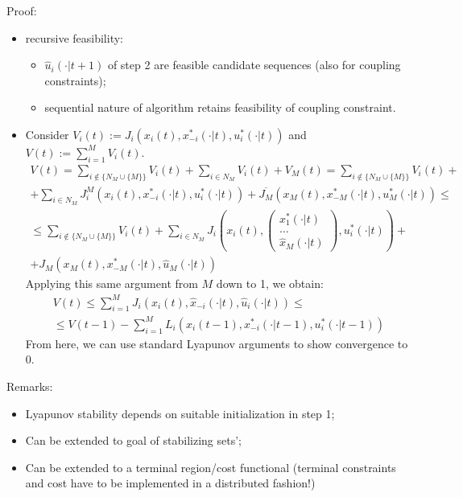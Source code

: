     Proof:
    \begin{itemize}
        \item recursive feasibility:
        \begin{itemize}
            \item $\hat u_i(\cdot|t+1)$ of step 2 are feasible candidate sequences (also for coupling constraints);
            \item sequential nature of algorithm retains feasibility of coupling constraint.
        \end{itemize}
        \item Consider $V_i(t) := J_i(x_i(t),x_{-i}^*(\cdot|t),u_i^*(\cdot|t))$ and $V(t) := \sum_{i=1}^M V_i(t)$.
        \begin{multline*}
        V(t) = \sum_{i \notin \{N_M \cup \{M\}\}} V_i(t) + \sum_{i \in N_M} V_i(t) + V_M(t) = \sum_{i \notin \{N_M \cup \{M\}\}} V_i(t) + \\ + \sum_{i \in N_M} J_i^M(x_i(t),x_{-i}^*(\cdot|t),u_i^*(\cdot|t)) + \overline{J_M}(x_M(t),x_{-M}^*(\cdot|t),u_M^*(\cdot|t)) \le \\ \le \sum_{i \notin \{N_M \cup \{M\}\}} V_i(t) + \sum_{i \in N_M} J_i(x_i(t),\begin{pmatrix} x_1^*(\cdot|t) \\ \dots \\ \hat x_M(\cdot|t) \end{pmatrix},u_i^*(\cdot|t)) + \\ + J_M(x_M(t),x_{-M}^*(\cdot|t),\hat u_M(\cdot|t))
        \end{multline*}
        Applying this same argument from $M$ down to 1, we obtain:
        \begin{multline*}
        V(t) \le \sum_{i=1}^M J_i(x_i(t),\hat x_{-i}(\cdot|t),\hat u_i(\cdot|t)) \le \\ \le V(t-1) - \sum_{i=1}^ML_i(x_i(t-1),x_{-i}^*(\cdot|t-1),u_i^*(\cdot|t-1))
        \end{multline*}
        From here, we can use standard Lyapunov arguments to show convergence to 0.\\
    \end{itemize}
    
    Remarks:
    \begin{itemize}
        \item Lyapunov stability depends on suitable initialization in step 1;
        \item Can be extended to goal of stabilizing sets';
        \item Can be extended to a terminal region/cost functional (terminal constraints and cost have to be implemented in a distributed fashion!)\\
    \end{itemize}
    
